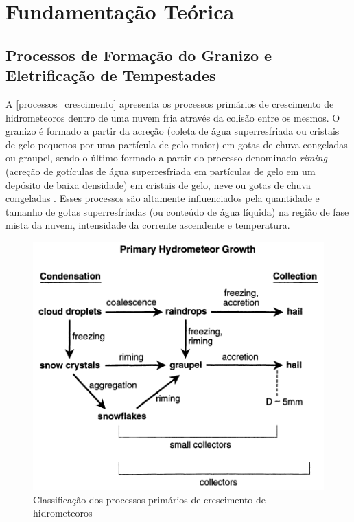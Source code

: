 \chapter{Fundamentação Teórica}\label{teoria}

\section{Processos de Formação do Granizo e Eletrificação de Tempestades}\label{granizo_eletrificacao}

A \autoref{processos_crescimento} apresenta os processos primários de crescimento de hidrometeoros dentro de uma nuvem fria através da colisão entre os mesmos. O granizo é formado a partir da acreção (coleta de água superresfriada ou cristais de gelo pequenos por uma partícula de gelo maior) em gotas de chuva congeladas ou graupel, sendo o último formado a partir do processo denominado \textit{riming} (acreção de gotículas de água superresfriada em partículas de gelo em um depósito de baixa densidade) em cristais de gelo, neve ou gotas de chuva congeladas \cite{Reinking1975}. Esses processos são altamente influenciados pela quantidade e tamanho de gotas superresfriadas (ou conteúdo de água líquida) na região de fase mista da nuvem, intensidade da corrente ascendente e temperatura.

\begin{figure}[htb]
	\begin{center}
		\caption{Classificação dos processos primários de crescimento de hidrometeoros} 
		\label{processos_crescimento}
		\includegraphics[width=0.7\columnwidth]{figs/growth_knight.png}
	\end{center}
\end{figure}

